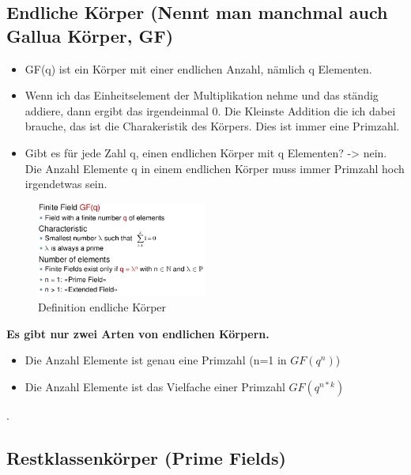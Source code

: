 \hypertarget{endliche-kuxf6rper-nennt-man-manchmal-auch-gallua-kuxf6rper-gf}{%
\subsection{Endliche Körper (Nennt man manchmal auch Gallua Körper,
GF)}\label{endliche-kuxf6rper-nennt-man-manchmal-auch-gallua-kuxf6rper-gf}}

\begin{itemize}
\tightlist
\item
  GF(q) ist ein Körper mit einer endlichen Anzahl, nämlich q Elementen.
\item
  Wenn ich das Einheitselement der Multiplikation nehme und das ständig
  addiere, dann ergibt das irgendeinmal 0. Die Kleinste Addition die ich
  dabei brauche, das ist die Charakeristik des Körpers. Dies ist immer
  eine Primzahl.
\item
  Gibt es für jede Zahl q, einen endlichen Körper mit q Elementen?
  -> nein. Die Anzahl Elemente q in einem endlichen Körper
  muss immer Primzahl hoch irgendetwas sein.
\end{itemize}

\begin{figure}[H]
\centering
\includegraphics[width=0.5\textwidth]{figures/finiteFields.png}
\caption{Definition endliche Körper}
\end{figure}

\textbf{Es gibt nur zwei Arten von endlichen Körpern.} 
\begin{itemize}
    \item Die Anzahl Elemente ist genau eine Primzahl (n=1 in $GF(q^n)$)
    \item Die Anzahl Elemente ist das Vielfache einer Primzahl $GF(q^{n*k})$
\end{itemize}.

\hypertarget{restklassenkuxf6rper-prime-fields}{%
\subsection{Restklassenkörper (Prime
Fields)}\label{restklassenkuxf6rper-prime-fields}}


